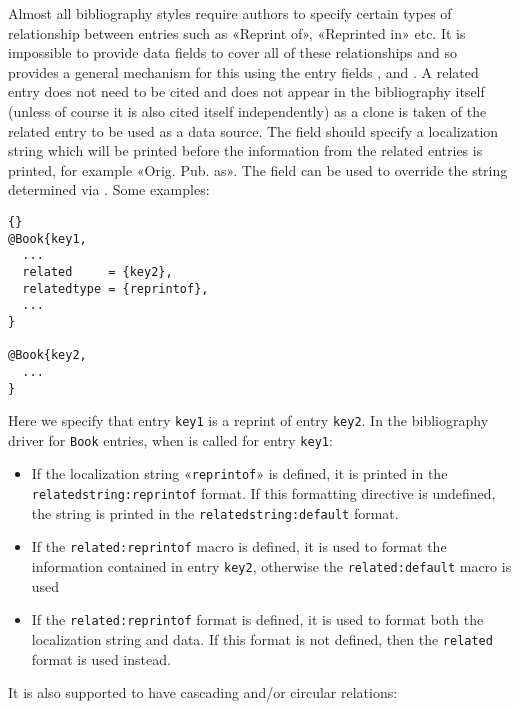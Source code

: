 Almost all bibliography styles require authors to specify certain types of relationship between entries such as «Reprint of», «Reprinted in» etc. It is impossible to provide data fields to cover all of these relationships and so \biblatex provides a general mechanism for this using the entry fields ,  and . A related entry does not need to be cited and does not appear in the bibliography itself (unless of course it is also cited itself independently) as a clone is taken of the related entry to be used as a data source. The  field should specify a localization string which will be printed before the information from the related entries is printed, for example «Orig. Pub. as». The  field can be used to override the string determined via . Some examples:

\begin{lstlisting}[style=bibtex]{}
@Book{key1,
  ...
  related     = {key2},
  relatedtype = {reprintof},
  ...
}

@Book{key2,
  ...
}
\end{lstlisting}
%
Here we specify that entry \texttt{key1} is a reprint of entry \texttt{key2}. In the bibliography driver for \texttt{Book} entries, when  is called for entry \texttt{key1}:

\begin{itemize}
\item If the localization string «\texttt{reprintof}» is defined, it is printed in the \texttt{relatedstring:reprintof} format. If this formatting directive is undefined, the string is printed in the \texttt{relatedstring:default} format.
\item If the \texttt{related:reprintof} macro is defined, it is used to format the information contained in entry \texttt{key2}, otherwise the \texttt{related:default} macro is used
\item If the \texttt{related:reprintof} format is defined, it is used to format both the localization string and data. If this format is not defined, then the \texttt{related} format is used instead.
\end{itemize}
%
It is also supported to have cascading and/or circular relations:

